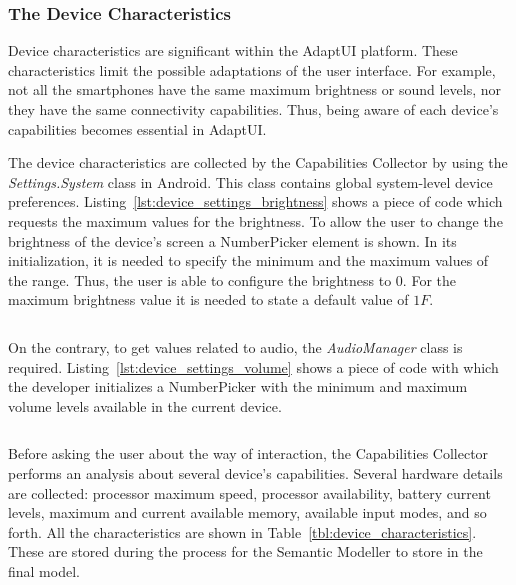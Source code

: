 \subsubsection{The Device Characteristics}
\label{sec:device_characteristics}

Device characteristics are significant within the AdaptUI platform. These
characteristics limit the possible adaptations of the user interface. For example,
not all the smartphones have the same maximum brightness or sound levels, nor
they have the same connectivity capabilities. Thus, being aware of each device's
capabilities becomes essential in AdaptUI.

The device characteristics are collected by the Capabilities Collector by using
the \textit{Settings.System} class in Android. This class contains global
system-level device preferences. Listing~\ref{lst:device_settings_brightness} 
shows a piece of code which requests the maximum values for the brightness. To 
allow the user to change the brightness of the device's screen a NumberPicker 
element is shown. In its initialization, it is needed to specify the minimum and 
the maximum values of the range. Thus, the user is able to configure the brightness 
to $0$. For the maximum brightness value it is needed to state a default value 
of $1F$.

\inputminted[linenos=true, fontsize=\footnotesize, frame=lines]{java}{4_system_architecture/device_settings_brightness.java}


On the contrary, to get values related to audio, the \textit{AudioManager} class
is required. Listing~\ref{lst:device_settings_volume} shows a piece of code with
which the developer initializes a NumberPicker with the minimum and maximum
volume levels available in the current device.

\inputminted[linenos=true, fontsize=\footnotesize, frame=lines]{java}{4_system_architecture/device_settings_volume.java}


Before asking the user about the way of interaction, the Capabilities Collector
performs an analysis about several device's capabilities. Several hardware
details are collected: processor maximum speed, processor availability, battery
current levels, maximum and current available memory, available input modes, 
and so forth. All the characteristics are shown in Table~\ref{tbl:device_characteristics}. 
These are stored during the process for the Semantic Modeller to store in the 
final model.

